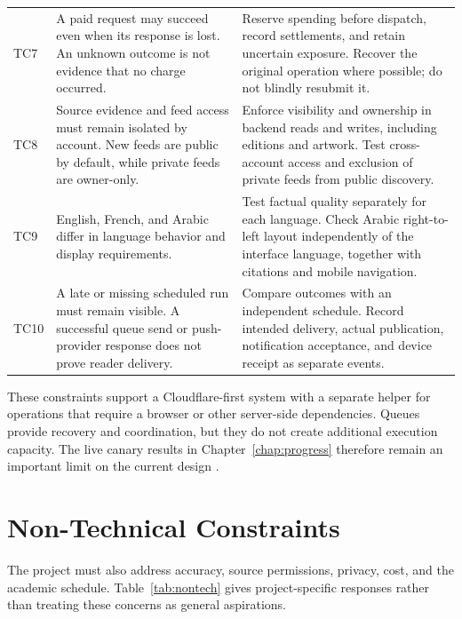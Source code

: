 \begin{longtable}{L{1cm}L{5cm}L{\dimexpr\linewidth-6cm-6\tabcolsep\relax}}
TC7 & A paid request may succeed even when its response is lost. An unknown outcome is not evidence that no charge occurred.
& Reserve spending before dispatch, record settlements, and retain uncertain exposure. Recover the original operation where possible; do not blindly resubmit it. \\
TC8 & Source evidence and feed access must remain isolated by account. New feeds are public by default, while private feeds are owner-only.
& Enforce visibility and ownership in backend reads and writes, including editions and artwork. Test cross-account access and exclusion of private feeds from public discovery. \\
TC9 & English, French, and Arabic differ in language behavior and display requirements.
& Test factual quality separately for each language. Check Arabic right-to-left layout independently of the interface language, together with citations and mobile navigation. \\
TC10 & A late or missing scheduled run must remain visible. A successful queue send or push-provider response does not prove reader delivery.
& Compare outcomes with an independent schedule. Record intended delivery, actual publication, notification acceptance, and device receipt as separate events. \\
\end{longtable}
\endgroup

\begingroup{} These constraints support a Cloudflare-first system with a separate helper for operations that require a browser or other server-side dependencies. Queues provide recovery and coordination, but they do not create additional execution capacity. The live canary results in Chapter~\ref{chap:progress} therefore remain an important limit on the current design \cite{repo,currentintegration,canaryrecovery}.\par\endgroup

\section{Non-Technical Constraints}

The project must also address accuracy, source permissions, privacy, cost, and the academic schedule. Table~\ref{tab:nontech} gives project-specific responses rather than treating these concerns as general aspirations.

